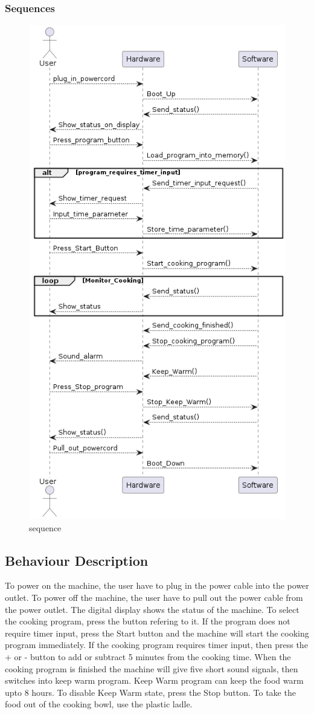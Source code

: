 \documentclass{scrartcl}
\begin{document}
\subsubsection{Sequences}
\begin{figure}[H]\centering
    \includegraphics[width=0.65\columnwidth]{Sequence.png}
    \caption{sequence}\label{fig:4}
\end{figure}

\subsection{Behaviour Description}
To power on the machine, the user have to plug in the power cable into the power outlet. To power off the machine, the user have to pull out the power cable from the power outlet. The digital display shows the status of the machine. To select the cooking program, press the button refering to it. If the program does not require timer input, press the Start button and the machine will start the cooking program immediately. If the cooking program requires timer input, then press the + or - button to add or subtract 5 minutes from the cooking time. When the cooking program is finished the machine will give five short sound signals, then switches into keep warm program. Keep Warm program can keep the food warm upto 8 hours. To disable Keep Warm state, press the Stop button. To take the food out of the cooking bowl, use the plastic ladle.
\end{document}
